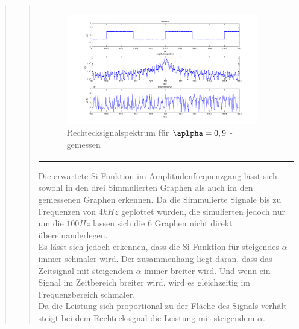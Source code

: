 \begin{quote}
\begin{quote}
\begin{center}
\begin{tabular}{ll}
\begin{minipage}{0.6\textwidth}
                    \begin{figure}[H]
                        \label{fig:}            
                        \includegraphics[scale=0.3]{./Bilder/recht_alpha9_-_gemessen.png} %
                        \caption{Rechtecksignalspektrum für $\aplpha = 0,9$ - gemessen}
                    \end{figure}                
                
                \end{minipage}
                        
            \end{tabular}
            \end{center}
            
            Die erwartete Si-Funktion im Amplitudenfrequenzgang lässt sich sowohl in den drei Simmulierten Graphen als
            auch im den gemessenen Graphen erkennen. Da die Simmulierte Signale bis zu Frequenzen von $4 kHz$ geplottet
            wurden, die simulierten jedoch nur um die $100 Hz$ lassen sich die 6 Graphen nicht direkt
            übereinanderlegen.\\
            Es lässt sich jedoch erkennen, dass die Si-Funktion für steigendes $\alpha$ immer schmaler wird. Der
            zusammenhang liegt daran, dass das Zeitsignal mit steigendem $\alpha$ immer breiter wird. Und wenn ein
            Signal im Zeitbereich breiter wird, wird es gleichzeitig im Frequenzbereich schmaler.\\
            
            Da die Leistung sich proportional zu der Fläche des Signals verhält steigt bei dem Rechtecksignal die
            Leistung mit steigendem $\alpha$.
                     

\end{quote}
\end{quote}
